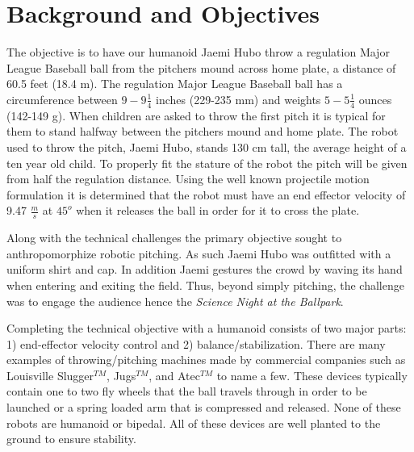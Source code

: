\section{Background and Objectives}\label{sec:background}

The objective is to have our humanoid Jaemi Hubo throw a regulation Major League Baseball ball from the pitchers mound across home plate, a distance of 60.5 feet (18.4 m).  
The regulation Major League Baseball ball has a circumference between $9 - 9\frac{1}{4}$ inches (229-235 mm) and weights $5-5\frac{1}{4}$ ounces (142-149 g)\cite{mlbrules}.  
When children are asked to throw the first pitch it is typical for them to stand halfway between the pitchers mound and home plate.
The robot used to throw the pitch, Jaemi Hubo, stands 130 cm tall, the average height of a ten year old child.
To properly fit the stature of the robot the pitch will be given from half the regulation distance.
Using the well known projectile motion formulation it is determined that the robot must have an end effector velocity of 9.47 $\frac{m}{s}$ at $45^o$ when it releases the ball in order for it to cross the plate.

Along with the technical challenges the primary objective sought to anthropomorphize robotic pitching.  
As such Jaemi Hubo was outfitted with a uniform shirt and cap.
In addition Jaemi gestures the crowd by waving its hand when entering and exiting the field.
Thus, beyond simply pitching, the challenge was to engage the audience hence the \textit{Science Night at the Ballpark}.





Completing the technical objective with a humanoid consists of two major parts: 1) end-effector velocity control and 2) balance/stabilization. 
There are many examples of throwing/pitching machines made by commercial companies such as Louisville Slugger$^{TM}$, Jugs$^{TM}$, and Atec$^{TM}$ to name a few.  
These devices typically contain one to two fly wheels that the ball travels through in order to be launched or a spring loaded arm that is compressed and released.
None of these robots are humanoid or bipedal.
All of these devices are well planted to the ground to ensure stability.

